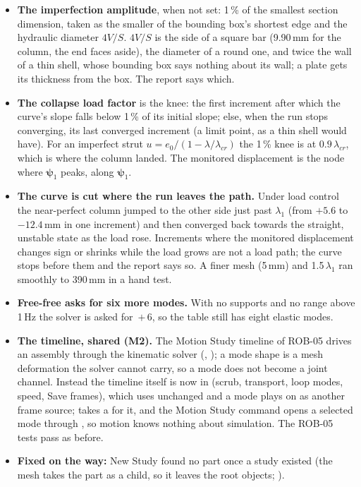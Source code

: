 \begin{itemize}[nosep]
        (2\,\% of the load at most) and the monitored node printed every increment. Prescribed displacements are not
        scaled.
  \item \textbf{The imperfection amplitude}, when not set: 1\,\% of the smallest section dimension, taken as the
        smaller of the bounding box's shortest edge and the hydraulic diameter $4V/S$. $4V/S$ is the side of a
        square bar (9.90\,mm for the column, the end faces aside), the diameter of a round one, and twice the wall
        of a thin shell, whose bounding box says nothing about its wall; a plate gets its thickness from the box.
        The report says which.
  \item \textbf{The collapse load factor} is the knee: the first increment after which the curve's slope falls below
        1\,\% of its initial slope; else, when the run stops converging, its last converged increment (a limit
        point, as a thin shell would have). For an imperfect strut $u=e_0/(1-\lambda/\lambda_{cr})$ the 1\,\% knee
        is at $0.9\,\lambda_{cr}$, which is where the column landed. The monitored displacement is the node where
        $\boldsymbol\psi_1$ peaks, along $\boldsymbol\psi_1$.
  \item \textbf{The curve is cut where the run leaves the path.} Under load control the near-perfect column jumped
        to the other side just past $\lambda_1$ (from $+5.6$ to $-12.4$\,mm in one increment) and then converged
        back towards the straight, unstable state as the load rose. Increments where the monitored displacement
        changes sign or shrinks while the load grows are not a load path; the curve stops before them and the
        report says so. A finer mesh (5\,mm) and 1.5\,$\lambda_1$ ran smoothly to 390\,mm in a hand test.
  \item \textbf{Free-free asks for six more modes.} With no supports and no range above 1\,Hz the solver is asked
        for \,$+\,6$, so the table still has eight elastic modes.
  \item \textbf{The timeline, shared (M2).} The Motion Study timeline of ROB-05 drives an assembly through the
        kinematic solver (, ); a mode shape is a mesh deformation the
        solver cannot carry, so a mode does not become a joint channel. Instead the timeline itself is now
         in  (scrub, transport, loop modes, speed, Save frames), which
         uses unchanged and a mode plays on as another frame source;  takes
        a  for it, and the Motion Study command opens a selected mode through
        , so motion knows nothing about simulation. The ROB-05 tests pass as before.
  \item \textbf{Fixed on the way:} New Study found no part once a study existed (the mesh takes the part as a child,
        so it leaves the root objects; ).
\end{itemize}

